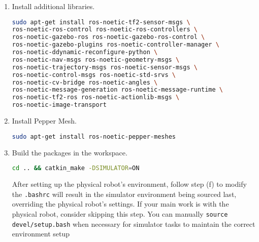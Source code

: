 \documentclass{CSSRforAfrica}
\begin{document}
{\begin{enumerate}
\begin{enumerate}
\begin{lstlisting}[style=withoutNumbering, language=bash]
git clone -b simulation_that_works \
https://github.com/awesomebytes/pepper_virtual
\end{lstlisting} 

\begin{lstlisting}[style=withoutNumbering, language=bash]
git clone https://github.com/cssr4africa/\gazebo_model_velocity_plugin
\end{lstlisting} 

\item Install additional libraries.
\begin{lstlisting}[style=withoutNumbering, language=bash]
sudo apt-get install ros-noetic-tf2-sensor-msgs \
ros-noetic-ros-control ros-noetic-ros-controllers \
ros-noetic-gazebo-ros ros-noetic-gazebo-ros-control \
ros-noetic-gazebo-plugins ros-noetic-controller-manager \
ros-noetic-ddynamic-reconfigure-python \
ros-noetic-nav-msgs ros-noetic-geometry-msgs \
ros-noetic-trajectory-msgs ros-noetic-sensor-msgs \
ros-noetic-control-msgs ros-noetic-std-srvs \
ros-noetic-cv-bridge ros-noetic-angles \
ros-noetic-message-generation ros-noetic-message-runtime \
ros-noetic-tf2-ros ros-noetic-actionlib-msgs \
ros-noetic-image-transport
\end{lstlisting}

\item Install Pepper Mesh.
\begin{lstlisting}[style=withoutNumbering, language=bash]
sudo apt-get install ros-noetic-pepper-meshes
\end{lstlisting}

\item Build the packages in the workspace.
\begin{lstlisting}[style=withoutNumbering, language=bash]
cd .. && catkin_make -DSIMULATOR=ON
\end{lstlisting}

\begingroup
\tcbset{%
noteshift/.store in=\mynote@shift,
noteshift=0.2cm
}
\begin{tcolorbox}[nobeforeafter,
enhanced,
sharp corners,
toprule=1pt,
bottomrule=1pt,
leftrule=0pt,
rightrule=0pt,
colback=yellow!20,
left skip=\mynote@shift,
right skip=\mynote@shift,
overlay={\node[left] (mynotenode) at ([xshift=-\mynote@shift]frame.west) {\textbf{\textcolor{greenyellow}{Note:}}} ;},]
After setting up the physical robot's environment, follow step (f) to modify the \texttt{.bashrc} will result in the simulator environment being sourced last, overriding the physical robot's settings. If your main work is with the physical robot, consider skipping this step. You can manually \texttt{source devel/setup.bash} when necessary for simulator tasks to maintain the correct environment setup 
\end{tcolorbox}
\endgroup


\end{enumerate}
\end{enumerate}}
\end{document}
